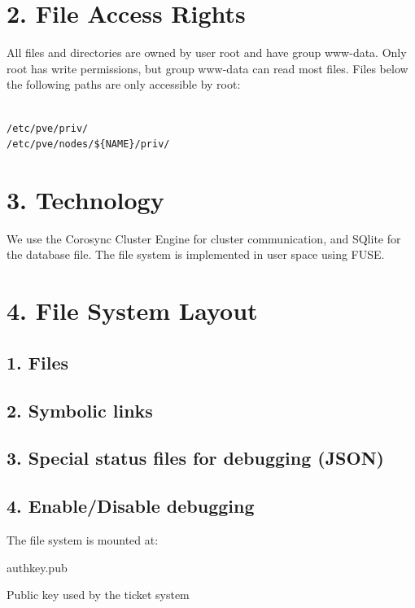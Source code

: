 \section{2. File Access Rights}

All files and directories are owned by user root and have group www-data. Only root has write permissions, but group www-data can read most files. Files below the following paths are only accessible by root:

\begin{lstlisting}

/etc/pve/priv/
/etc/pve/nodes/${NAME}/priv/

\end{lstlisting}


\section{3. Technology}

We use the Corosync Cluster Engine for cluster communication, and SQlite for the database file. The file system is implemented in user space using FUSE.


\section{4. File System Layout}

\subsection{1. Files}

\subsection{2. Symbolic links}

\subsection{3. Special status files for debugging (JSON)}

\subsection{4. Enable/Disable debugging}

The file system is mounted at:

authkey.pub

Public key used by the ticket system

